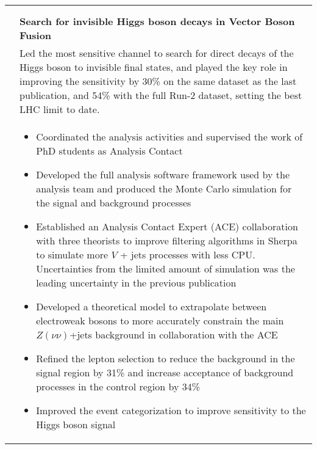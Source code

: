 \documentclass[a4paper,10pt]{article}
\begin{document}
\begin{tabularx}{\textwidth}{>{\centering\arraybackslash}X p{} }
{\bf \large Data Analysis} &  \\
\vspace{1mm}  & \vspace{1mm} \\ 
 {\sl 2017--2020}  &  \textbf{Search for invisible Higgs boson decays in Vector Boson Fusion} \\
			   & Led the most sensitive channel to search for direct decays of the Higgs boson to invisible final states, and played the key role in improving the sensitivity by 30\% on the same dataset as the last publication, and 54\% with the full Run-2 dataset, setting the best
         LHC limit to date. \\
			   & \begin{itemize}
         \item Coordinated the analysis activities and supervised the work of PhD students as Analysis Contact
			   \item Developed the full analysis software framework used by the analysis team and produced the Monte Carlo simulation for the signal and background processes
			   \item Established an Analysis Contact Expert (ACE) collaboration with three theorists to improve filtering algorithms in Sherpa to simulate more $V$ + jets processes with less CPU. Uncertainties from the limited amount of simulation was the leading uncertainty in the previous publication
				\item Developed a theoretical model to extrapolate between electroweak bosons to more accurately constrain the main $Z\left(\nu\nu\right)$+jets background in collaboration with the ACE
				\item Refined the lepton selection to reduce the background in the signal region by 31\% and increase acceptance of background processes in the control region by 34\%
				\item Improved the event categorization to improve sensitivity to the Higgs boson signal
			  \end{itemize}\\[-1.5ex]
\end{tabularx}
\end{document}
